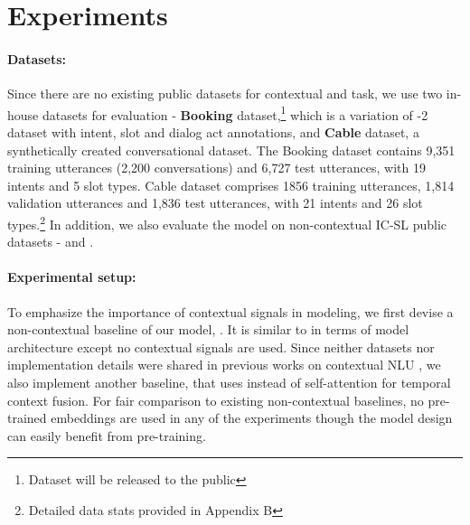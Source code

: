 \label{sec:experiments_f}

\section{Experiments}
%

\paragraph{Datasets:} Since there are no existing public datasets for contextual  and  task, we use two in-house datasets for evaluation - \textbf{Booking} dataset,\footnote{Dataset will be released to the public} which is a variation of -2 dataset \cite{williams2014dialog} with intent, slot and dialog act annotations, and \textbf{Cable} dataset, a synthetically created conversational dataset. 
The Booking dataset contains 9,351 training utterances (2,200 conversations) and 6,727 test utterances, with 19 intents and 5 slot types. Cable dataset comprises 1856 training utterances, 1,814 validation utterances and 1,836 test utterances, with 21 intents and 26 slot types.\footnote{Detailed data stats provided in Appendix B}
In addition, we also evaluate the model on non-contextual IC-SL public datasets -  \cite{hemphill90} and  \cite{coucke2018snips}.

\paragraph{Experimental setup:} 
To emphasize the importance of contextual signals in modeling, we first devise a non-contextual baseline of our  model, . It is similar to  in terms of model architecture except no contextual signals are used. 
Since neither datasets nor implementation details were shared in previous works on contextual NLU \cite{Bhargava2013EasyCI, Shi2015ContextualSL}, we also implement another baseline,  that uses  \cite{cho2014learning} instead of self-attention for temporal context fusion. For fair comparison to existing non-contextual baselines, no pre-trained embeddings are used in any of the experiments though the model design can easily benefit from pre-training.


